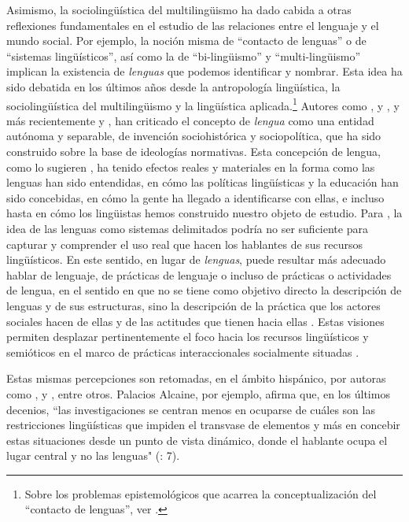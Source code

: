\documentclass[output=paper]{langscibook}
\begin{document}
Asimismo, la sociolingüística del multilingüismo ha dado cabida a otras reflexiones fundamentales en el estudio de las relaciones entre el lenguaje y el mundo social. Por ejemplo, la noción misma de “contacto de lenguas” o de “sistemas lingüísticos”, así como la de “bi-lingüismo” y “multi-lingüismo” implican la existencia de \textit{lenguas} que podemos identificar y nombrar. Esta idea ha sido debatida en los últimos años desde la antropología lingüística, la sociolingüística del multilingüismo y la lingüística aplicada.\footnote{Sobre los problemas epistemológicos que acarrea la conceptualización del “contacto de lenguas”, ver \citet{Nicolaï2012}.} Autores como    \citet{MakoniPennycook2006}, \citet{Léglise2007} y \citet{Heller2007}, y más recientemente    \citet{OtheguyEtAl2015} y \citet{Léglise2018}, han criticado el concepto de \textit{lengua} como una entidad autónoma y separable, de invención sociohistórica y sociopolítica, que ha sido construido sobre la base de ideologías normativas. Esta concepción de lengua, como lo sugieren   \citet[138]{MakoniPennycook2005}, ha tenido efectos reales y materiales en la forma como las lenguas han sido entendidas, en cómo las políticas lingüísticas y la educación han sido concebidas, en cómo la gente ha llegado a identificarse con ellas, e incluso hasta en cómo los lingüistas hemos construido nuestro objeto de estudio. Para \citet[27]{JørgensenEtAl2011}, la idea de las lenguas como sistemas delimitados podría no ser suficiente para capturar y comprender el uso real que hacen los hablantes de sus recursos lingüísticos. En este sentido, en lugar de \textit{lenguas}, puede resultar más adecuado hablar de lenguaje, de prácticas de lenguaje o incluso de prácticas o actividades de lengua, en el sentido en que no se tiene como objetivo directo la descripción de lenguas y de sus estructuras, sino la descripción de la práctica que los actores sociales hacen de ellas y de las actitudes que tienen hacia ellas \citep[14]{Léglise2007}. Estas visiones permiten desplazar pertinentemente el foco hacia los recursos lingüísticos y semióticos en el marco de prácticas interaccionales socialmente situadas \citep{Mondada2002}.

Estas mismas percepciones son retomadas, en el ámbito hispánico, por autoras como \citet[273]{Nussbaum2012},  \citet[7]{PalaciosAlcaine2017intro} y   \citet[4]{BürkiPatzelt2020}, entre otros. Palacios Alcaine, por ejemplo, afirma que, en los últimos decenios, “las investigaciones se centran menos en ocuparse de cuáles son las restricciones lingüísticas que impiden el transvase de elementos y más en concebir estas situaciones desde un punto de vista dinámico, donde el hablante ocupa el lugar central y no las lenguas" (\citealt{PalaciosAlcaine2017intro}: 7).
\end{document}
